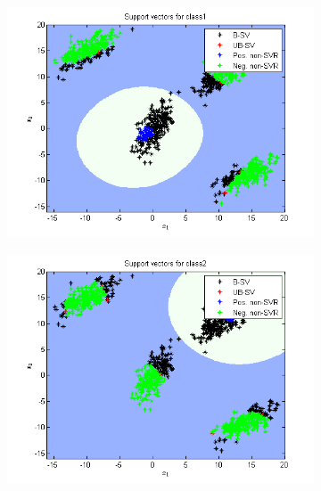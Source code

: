 \documentclass{article}
\begin{document}
\begin{figure}
\begin{subfigure}{.5\textwidth}
  \centering
  \includegraphics[width=.8\linewidth]{Classification/1a/nu_g/sv1}
 
\end{subfigure}%
\begin{subfigure}{.5\textwidth}
  \centering
  \includegraphics[width=.8\linewidth]{Classification/1a/nu_g/sv2}
  
\end{subfigure}
\end{figure}
\end{document}
